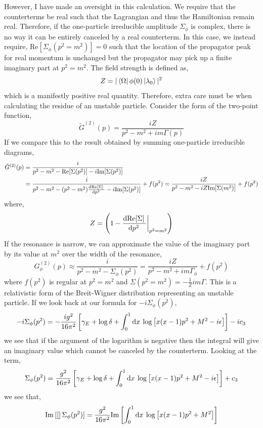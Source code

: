 \documentclass{article}
\begin{document}
However, I have made an oversight in this calculation. We require that the counterterms be real such that the Lagrangian and thus the Hamiltonian remain real. Therefore, if the one-particle irreducible amplitude $\Sigma_\phi$ is complex, there is no way it can be entirely canceled by a real counterterm. In this case, we instead require, $\mathrm{Re}[\Sigma_\phi(p^2 = m^2)] = 0$ such that the location of the propagator peak for real momentum is unchanged but the propagator may pick up a finite imaginary part at $p^2 = m^2$. The field strength is defined as, 
\[Z = |\left< \Omega \right|\phi(0)\left| \lambda_0 \right>|^2\]
which is a manifestly positive real quantity. Therefore, extra care must be when calculating the residue of an unstable particle. Consider the form of the two-point function,
\[ \tilde{G}^{(2)}(p) = \frac{i Z}{p^2 - m^2 + i m \Gamma(p)} \]
If we compare this to the result obtained by summing one-particle irreducible diagrams,
\begin{align*}
\tilde{G}^{(2)}(p) & = \frac{i}{p^2 - m^2 - \mathrm{Re}[\Sigma(p^2)] - i \mathrm{Im}[\Sigma(p^2)]}
\\
& = \frac{i}{p^2 - m^2 - (p^2 - m^2) \frac{\mathrm{d}\mathrm{Re}[\Sigma] \:}{\mathrm{d}p^2 \:}  - i \mathrm{Im}[\Sigma(p^2)]} + f(p^2) =\frac{i Z}{p^2 - m^2 - i Z \mathrm{Im}[\Sigma(m^2)]} + f(p^2) 
\end{align*}
where,
\[ Z = \left(1 - \frac{\mathrm{d}\mathrm{Re}[\Sigma] \:}{\mathrm{d}p^2 \:} \bigg|_{p^2 = m^2} \right) \]
If the resonance is narrow, we can approximate the value of the imaginary part by its value at $m^2$ over the width of the resonance,
\[ G^{(2)}_\phi(p) \approx \frac{i}{p^2 - m^2 - \Sigma_\phi(p^2)} = \frac{i Z}{p^2 - m^2 + i m \Gamma_\phi} + f(p^2)\]
where $f(p^2)$ is regular at $p^2 = m^2$ and $\Sigma(p^2 = m^2) = -\frac{1}{Z} i m \Gamma$. This is a relativistic form of the Breit-Wigner distribution representing an unstable particle. If we look back at our formula for $-i \Sigma_\phi(p^2)$,
\[ - i \Sigma_\phi(p^2) = - \frac{ig^2}{16 \pi^2}  \left[ \gamma_E + \log{\delta} + \int_{0}^{1} \mathrm{d}x \: \log{\left[ x(x-1)p^2 + M^2 - i \epsilon \right]} \right] - i c_3 \]
we see that if the argument of the logarithm is negative then the integral will give an imaginary value which cannot be canceled by the counterterm. Looking at the term,
\[ \Sigma_\phi(p^2) = \frac{g^2}{16 \pi^2}  \left[ \gamma_E + \log{\delta} + \int_{0}^{1} \mathrm{d}x \: \log{\left[ x(x-1)p^2 + M^2 - i \epsilon \right]} \right] + c_3 \]
we see that,
\[\mathrm{Im}\left[ [ \right]\Sigma_\phi(p^2)] = \frac{g^2}{16 \pi^2} \mathrm{Im}\left[ \int_{0}^{1} \mathrm{d}x \: \log{\left[ x(x-1)p^2 + M^2 \right]} \right] \] 
\end{document}
